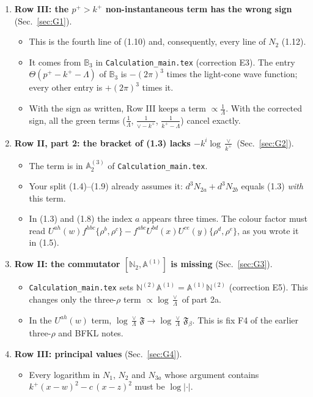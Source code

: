 \documentclass[10pt]{article}
\numberwithin{equation}{section}
\def\mf#1{\mathbb{#1}}
\begin{document}
\begin{enumerate}
\item[\textbf{G1}] \textbf{Row III: the $p^+>k^+$ non-instantaneous term has the wrong sign} (Sec.~\ref{sec:G1}).
\begin{itemize}
\item This is the fourth line of (1.10) and, consequently, every line of $N_2$ (1.12).
\item It comes from $\mf B_3$ in \texttt{Calculation\_main.tex} (correction E3). The entry $\Theta(p^+-k^+-\Lambda)$ of $\mf B_3$ is $-(2\pi)^3$ times the light-cone wave function; every other entry is $+(2\pi)^3$ times it.
\item With the sign as written, Row III keeps a term $\propto\frac1\Lambda$. With the corrected sign, all the green terms ($\frac1\Lambda$, $\frac1{\vee-k^+}$, $\frac1{k^+-\Lambda}$) cancel exactly.
\end{itemize}
\item[\textbf{G2}] \textbf{Row II, part 2: the bracket of (1.3) lacks $-k^i\log\frac{\vee}{k^+}$} (Sec.~\ref{sec:G2}).
\begin{itemize}
\item The term is in $\mf A^{(3)}_2$ of \texttt{Calculation\_main.tex}.
\item Your split (1.4)--(1.9) already assumes it: $d^3N_{2a}+d^3N_{2b}$ equals (1.3) \emph{with} this term.
\item In (1.3) and (1.8) the index $a$ appears three times. The colour factor must read $U^{ah}(w)f^{hbc}\{\rho^b,\rho^c\}-f^{abc}U^{bd}(x)U^{ce}(y)\{\rho^d,\rho^e\}$, as you wrote it in (1.5).
\end{itemize}
\item[\textbf{G3}] \textbf{Row II: the commutator $[\mf N_2,\mf A^{(1)}]$ is missing} (Sec.~\ref{sec:G3}).
\begin{itemize}
\item \texttt{Calculation\_main.tex} sets $\mf N^{(2)}\mf A^{(1)}=\mf A^{(1)}\mf N^{(2)}$ (correction E5). This changes only the three-$\rho$ term $\propto\log\frac{\vee}{\Lambda}$ of part 2a.
\item In the $U^{ah}(w)$ term, $\log\frac{\vee}{\Lambda}\,\mathfrak F\to\log\frac{\vee}{\Lambda}\,\mathfrak F_\beta$. This is fix F4 of the earlier three-$\rho$ and BFKL notes.
\end{itemize}
\item[\textbf{G4}] \textbf{Row III: principal values} (Sec.~\ref{sec:G4}).
\begin{itemize}
\item Every logarithm in $N_1$, $N_2$ and $N_{3a}$ whose argument contains $k^+(x-w)^2-c\,(x-z)^2$ must be $\log|\cdot|$.

\end{itemize}
\end{enumerate}
\end{document}
